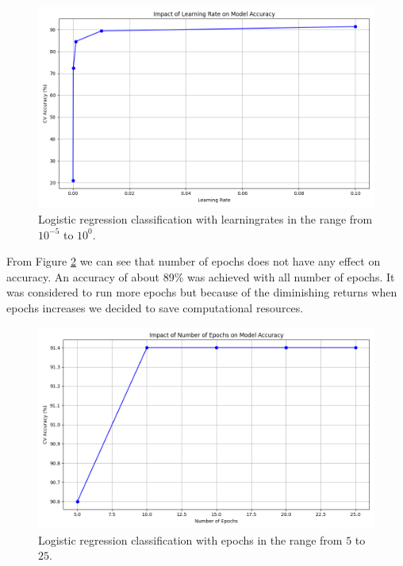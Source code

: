 \begin{figure}[H]
    \centering
    \includegraphics[width=\textwidth]{results/logreg/learning_rate_study.png}
    \caption{Logistic regression classification with learningrates in the range from $10^{-5}$ to $10^0$.}
    \label{fig:LogRegLearningRate}
\end{figure}

From Figure \ref{fig:LogRegEpochs} we can see that number of epochs does not have any effect on accuracy. An accuracy of about 89\% was achieved with all number of epochs. It was considered to run more epochs but because of the diminishing returns when epochs increases we decided to save computational resources. 

\begin{figure}[H]
    \centering
    \includegraphics[width=\textwidth]{results/logreg/number_of_epochs_study.png}
    \caption{Logistic regression classification with epochs in the range from $5$ to $25$.}
    \label{fig:LogRegEpochs}
\end{figure}

